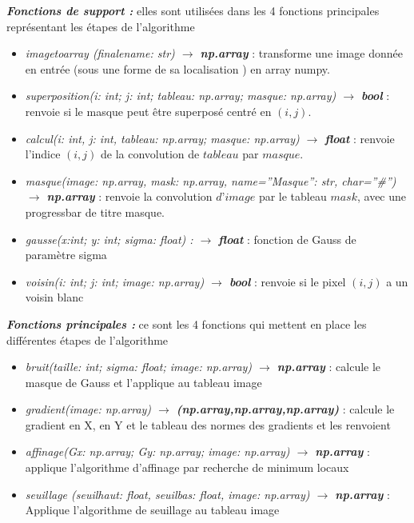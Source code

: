\documentclass[hidelinks,11pt]{article}
\theoremstyle{mytheoremstyle}
\theoremstyle{mytheoremstyle}
\theoremstyle{myproblemstyle}
\begin{document}
    \textit{\textbf{Fonctions de support : }} elles sont utilisées dans les 4 fonctions principales représentant les étapes de l'algorithme
    \newline
    \begin{itemize}
        \item \textit{image\textunderscore to\textunderscore array (finalename: str) $\rightarrow$ \textbf{np.array}} : transforme une image donnée en entrée (sous une forme de sa localisation ) en array numpy. 
        \smallskip
        \item \textit{superposition(i: int; j: int; tableau: np.array; masque: np.array) $\rightarrow$  \textbf{bool} }: renvoie si le masque peut être superposé centré en $(i,j)$. 
        \smallskip
        \item \textit{calcul(i: int, j: int, tableau: np.array; masque: np.array) $\rightarrow$  \textbf{float}} : renvoie l’indice $(i,j)$ de la convolution de $tableau$ par $masque$.
        \smallskip
        \item \textit{masque(image: np.array, mask: np.array, name=”Masque”: str, char=”\#”) $\rightarrow$  \textbf{np.array}} : renvoie la convolution $d’image$ par le tableau $mask$, avec une progressbar de titre masque.
        \smallskip
        \item \textit{gausse(x:int; y: int; sigma: float) : $\rightarrow$  \textbf{float}} : fonction de Gauss de paramètre sigma
        \smallskip
        \item \textit{voisin(i: int; j: int; image: np.array) $\rightarrow$  \textbf{bool} }: renvoie si le pixel $(i,j)$ a un voisin blanc
        \newline
    \end{itemize}
    
    \textit{\textbf{Fonctions principales : }} ce sont les 4 fonctions qui mettent en place les différentes étapes de l'algorithme
    \newline
    
    \begin{itemize}
        \item \textit{bruit(taille: int; sigma: float; image: np.array) $\rightarrow$ \textbf{np.array} }: calcule le masque de Gauss et l’applique au tableau image
        \smallskip
        \item \textit{gradient(image: np.array) $\rightarrow$ \textbf{(np.array,np.array,np.array)} }: calcule le gradient en X, en Y et le tableau des normes des gradients et les renvoient
        \smallskip
        \item \textit{affinage(Gx: np.array; Gy: np.array; image: np.array) $\rightarrow$ \textbf{np.array}} : applique  l’algorithme d’affinage par recherche de minimum locaux
        \smallskip
        \item \textit{seuillage (seuil\textunderscore haut: float, seuil\textunderscore bas: float, image: np.array) $\rightarrow$ \textbf{np.array} }
        : Applique l’algorithme de seuillage au tableau image 
        \newline
    \end{itemize}
\end{document}
